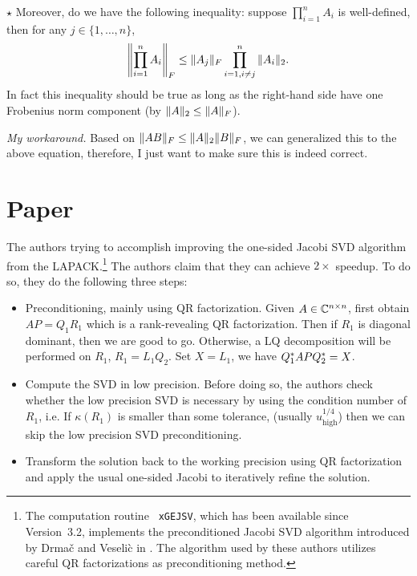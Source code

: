 \documentclass{article}
\newcommand{\code}[1]{\texttt{\color{green!30!black} #1}}
\begin{document}
\noindent$\star$ Moreover, do we have the following inequality: suppose
$\prod_{i=1}^n A_i$ is well-defined, then for any $j\in\{1,\dots,n\}$,
\begin{equation}\notag
    \left\|{\prod_{i=1}^n A_i}\right\|_F 
    \leq \|{A_j}\|_F\prod_{i=1, i\neq j}^n \|{A_i}\|_2.
\end{equation}
In fact this inequality should be true as long as the right-hand side
have one Frobenius norm component (by $\|{A}\|_2\leq\|{A}\|_F$).

\noindent\emph{My workaround.} Based on $\|{AB}\|_F\leq
\|{A}\|_2\|{B}\|_F$, we can generalized this to the above equation,
therefore, I just want to make sure this is indeed correct.

\section{Paper~\cite{2022GaoMaShao_mixedprecisionJacobi}}

The authors trying to accomplish improving the one-sided Jacobi SVD
algorithm from the LAPACK.\footnote{The computation routine
\code{xGEJSV}, which has been available since Version~3.2, implements the preconditioned Jacobi SVD algorithm
introduced by Drma\v{c} and Veseli\`{c} in
. The algorithm used by these authors
utilizes careful QR factorizations as preconditioning method.} The
authors claim that they can achieve $2\times$ speedup. To do so, they do
the following three steps:
\begin{itemize}[nosep]
    \item Preconditioning, mainly using QR factorization. 
    Given $A\in\mathbb{C}^{n\times n}$, first obtain $AP = Q_1R_1$ which is a
    rank-revealing QR factorization. Then if $R_1$ is diagonal dominant,
    then we are good to go. Otherwise, a LQ decomposition will be
    performed on $R_1$, $R_1 = L_1 Q_2$. Set $X = L_1$, we have $Q_1^{*}
    APQ_2^{*} = X$. 
    \item Compute the SVD in low precision. Before doing so, the authors
    check whether the low precision SVD is necessary by using the
    condition number of $R_1$, i.e. If $\kappa(R_1)$ is smaller than
    some tolerance, (usually $u_{\text{high}}^{1/4}$) then we can skip
    the low precision SVD preconditioning.  
    \item Transform the solution back to the working precision using QR
    factorization and apply the usual one-sided Jacobi to iteratively
    refine the solution. 
\end{itemize}
\end{document}
